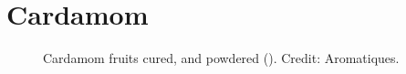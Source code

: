 


\section{Cardamom}
\label{sec:cardamom}\label{sec:black_cardamom}



\begin{figure}[!ht]
	\vspace{-2ex}
	\centering
	\hfill
	\hfill
	\caption[True cardamom]{Cardamom fruits cured, and powdered (). Credit: Aromatiques.}
	\label{fig:cardamom_imgs}
\end{figure}

